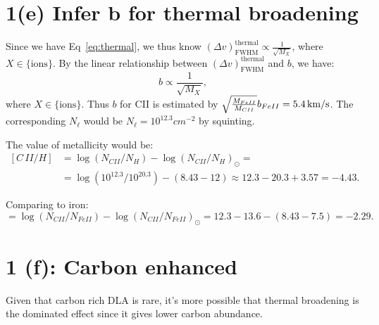 \documentclass[12pt,letterpaper]{article}
\newcommand{\kms}{\textrm{\,km/s}}
\newcommand{\dvfwhm}{(\Delta v)_{\textrm{FWHM}}}
\begin{document}
\section*{1(e) Infer b for thermal broadening}
Since we have Eq~\ref{eq:thermal}, we thus know $\dvfwhm^{\textrm{thermal}} \propto \frac{1}{\sqrt{M_X}}$, where $X \in \{\textrm{ions}\}$.
By the linear relationship between $\dvfwhm^{\textrm{thermal}}$ and $b$, we have:
\begin{equation*}
    b \propto \frac{1}{\sqrt{M_X}},
\end{equation*}
where $X \in \{\textrm{ions}\}$.
Thus $b$ for CII is estimated by $\sqrt{\frac{M_{FeII}}{M_{CII}}} b_{FeII} = 5.4 \kms$.
The corresponding $N_\ell$ would be $N_\ell = 10^{12.3} cm^{-2}$ by squinting.

The value of metallicity would be:
\begin{equation*}
    \begin{split}
        [C\,II/H] &= 
        \log{(N_{CII} / N_H)} - \log{(N_{CII} / N_H)}_\odot =\\
        &= \log{(10^{12.3} / 10^{20.3})} - ( 8.43 - 12 ) \approx 
        12.3 - 20.3 + 3.57 = -4.43.                
    \end{split}
\end{equation*}

Comparing to iron:
\begin{equation*}
    [C\,II, Fe\,II] = \log{(N_{CII} / N_{FeII})} - \log{(N_{CII} / N_{FeII})}_{\odot}
    = 12.3 - 13.6 - (8.43 - 7.5) = -2.29.
\end{equation*}


\section*{1 (f): Carbon enhanced}
Given that carbon rich DLA is rare, it's more possible that thermal broadening is the dominated effect since it gives lower carbon abundance.
\end{document}
